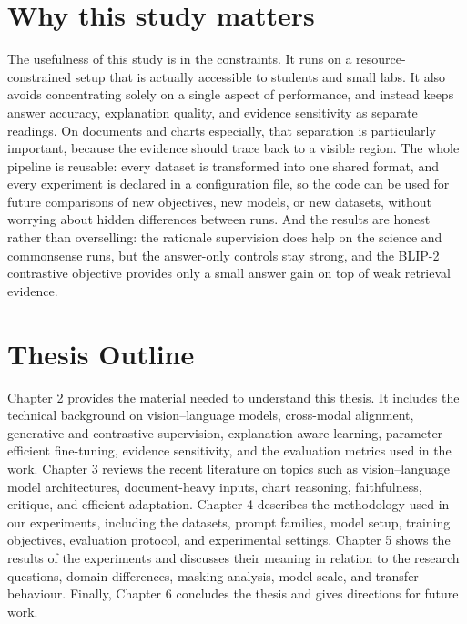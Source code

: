 \documentclass[12pt,bibliography=totoc,listof=totoc,BCOR=5mm,DIV=12,oneside,open=any]{scrbook}
\begin{document}
\section{Why this study matters}
The usefulness of this study is in the constraints.
It runs on a resource-constrained setup that is actually accessible to students and small labs.
It also avoids concentrating solely on a single aspect of performance, and instead keeps answer accuracy, explanation quality, and evidence sensitivity as separate readings.
On documents and charts especially, that separation is particularly important, because the evidence should trace back to a visible region.
The whole pipeline is reusable: every dataset is transformed into one shared format, and every experiment is declared in a configuration file,
so the code can be used for future comparisons of new objectives, new models, or new datasets, without worrying about hidden differences between runs.
And the results are honest rather than overselling: the rationale supervision does help on the science and commonsense runs, but the answer-only controls stay strong,
and the BLIP-2 contrastive objective provides only a small answer gain on top of weak retrieval evidence.

\section{Thesis Outline}
Chapter 2 provides the material needed to understand this thesis.
It includes the technical background on vision--language models, cross-modal alignment,
generative and contrastive supervision, explanation-aware learning,
parameter-efficient fine-tuning, evidence sensitivity, and the evaluation metrics used in the work.
Chapter 3 reviews the recent literature on topics such as vision--language model architectures,
document-heavy inputs, chart reasoning, faithfulness, critique, and efficient adaptation.
Chapter 4 describes the methodology used in our experiments,
including the datasets, prompt families, model setup, training objectives, evaluation protocol, and experimental settings.
Chapter 5 shows the results of the experiments and discusses their meaning in relation to the research questions, domain differences, masking analysis, model scale, and transfer behaviour.
Finally, Chapter 6 concludes the thesis and gives directions for future work.
\end{document}
